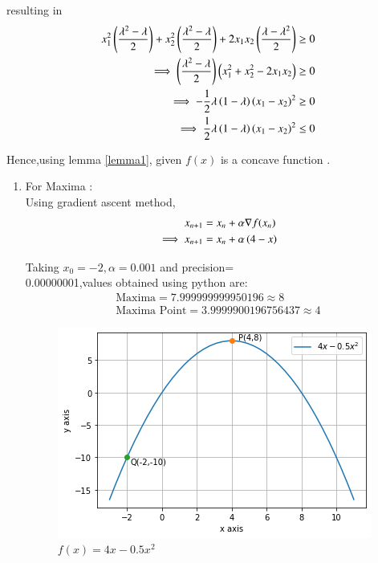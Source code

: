 \documentclass[journal,12pt,twocolumn]{IEEEtran}
\begin{document}
resulting in
\begin{align}
    x_1^2\left(\frac{\lambda^2-\lambda}{2}\right)+x_2^2\left(\frac{\lambda^2-\lambda}{2}\right)+ 2x_1x_2\left(\frac{\lambda-\lambda^2}{2}\right) &\geq 0 \\
    \implies \left(\frac{\lambda^2-\lambda}{2}\right)\left(x_1^2+x_2^2-2x_1x_2\right) &\geq 0 \\
    \implies -\frac{1}{2}\lambda\left(1-\lambda\right)\left(x_1-x_2\right)^2 &\geq 0 \\
    \implies \frac{1}{2}\lambda\left(1-\lambda\right)\left(x_1-x_2\right)^2 &\leq 0
\end{align}

Hence,using lemma \ref{lemma1}, given $f(x)$ is a concave function .

\begin{enumerate}
    \item For Maxima : \\
    Using gradient ascent method,
    \begin{align}
        x_{n+1} &= x_n + \alpha \nabla f(x_n) \\
        \implies x_{n+1} &= x_n + \alpha \left(4-x\right)
    \end{align}
    
    Taking $x_0=-2,\alpha=0.001$ and precision= \\ 0.00000001,values obtained using python are:
    \begin{align}
        \boxed{\text{Maxima} = 7.999999999950196 \approx 8 }\\
        \boxed{\text{Maxima Point} = 3.9999900196756437 \approx 4}
    \end{align}
    
    \begin{figure}[!ht]
    \centering
    \includegraphics[width=\columnwidth]{Figure15}
    \caption{$f(x)=4x-0.5x^2$}
    \label{f(x)}	
    \end{figure}


\end{enumerate}
\end{document}

